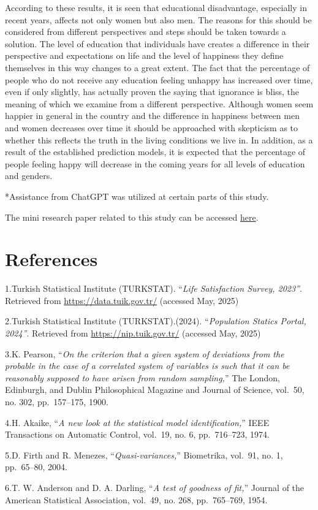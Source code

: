 \documentclass[
  11pt,
  a4paper,
  DIV=11,
  numbers=noendperiod]{scrartcl}
\begin{document}
According to these results, it is seen that educational disadvantage,
especially in recent years, affects not only women but also men. The
reasons for this should be considered from different perspectives and
steps should be taken towards a solution. The level of education that
individuals have creates a difference in their perspective and
expectations on life and the level of happiness they define themselves
in this way changes to a great extent. The fact that the percentage of
people who do not receive any education feeling unhappy has increased
over time, even if only slightly, has actually proven the saying that
ignorance is bliss, the meaning of which we examine from a different
perspective. Although women seem happier in general in the country and
the difference in happiness between men and women decreases over time it
should be approached with skepticism as to whether this reflects the
truth in the living conditions we live in. In addition, as a result of
the established prediction models, it is expected that the percentage of
people feeling happy will decrease in the coming years for all levels of
education and genders.

*Assistance from ChatGPT was utilized at certain parts of this study.

The mini research paper related to this study can be accessed
\href{assets/documents/Paper.pdf}{here}.

\section{References}\label{references}

1.Turkish Statistical Institute (TURKSTAT). ``\emph{Life Satisfaction
Survey, 2023''}. Retrieved from \url{https://data.tuik.gov.tr/}
(accessed May, 2025)

2.Turkish Statistical Institute (TURKSTAT).(2024). ``\emph{Population
Statics Portal, 2024''}. Retrieved from \url{https://nip.tuik.gov.tr/}
(accessed May, 2025)

3.K. Pearson, ``\emph{On the criterion that a given system of deviations
from the probable in the case of a correlated system of variables is
such that it can be reasonably supposed to have arisen from random
sampling,}'' The London, Edinburgh, and Dublin Philosophical Magazine
and Journal of Science, vol.~50, no. 302, pp.~157--175, 1900.

4.H. Akaike, ``\emph{A new look at the statistical model
identification,}'' IEEE Transactions on Automatic Control, vol.~19, no.
6, pp.~716--723, 1974.

5.D. Firth and R. Menezes, ``\emph{Quasi-variances,}'' Biometrika,
vol.~91, no. 1, pp.~65--80, 2004.

6.T. W. Anderson and D. A. Darling, ``\emph{A test of goodness of
fit,}'' Journal of the American Statistical Association, vol.~49, no.
268, pp.~765--769, 1954.
\end{document}

